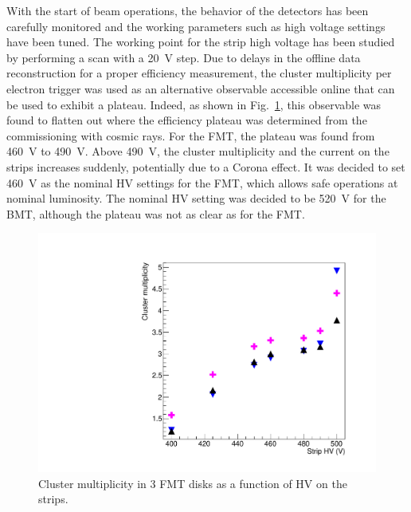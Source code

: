 With the start of beam operations, the behavior of the detectors has been carefully monitored and the working parameters
such as high voltage settings have been tuned. The working point for the strip high voltage has been studied by performing a
scan with a 20~V step. Due to delays in the offline data reconstruction for a proper efficiency measurement, the cluster
multiplicity per electron trigger was used as an alternative observable accessible online that can be used to exhibit a plateau. 
Indeed, as shown in Fig.~\ref{fig:mm-fig15}, this observable was found to flatten out where the efficiency plateau was
determined from the commissioning with cosmic rays. For the FMT, the plateau was found from 460~V to 490~V. Above 490~V, the
cluster multiplicity and the current on the strips increases suddenly, potentially due to a Corona effect. It was decided to set
460~V as the nominal HV settings for the FMT, which allows safe operations at nominal luminosity. The nominal HV setting was
decided to be 520~V for the BMT, although the plateau was not as clear as for the FMT.  

\begin{figure}[htb]
 \includegraphics[width=1.0\columnwidth,keepaspectratio]{images/PseudoEfficiencies_ClusterMultiplicities_FMT_only3layers.pdf}
 \caption{Cluster multiplicity in 3 FMT disks as a function of HV on the strips.}
 \label{fig:mm-fig15}
\end{figure}

